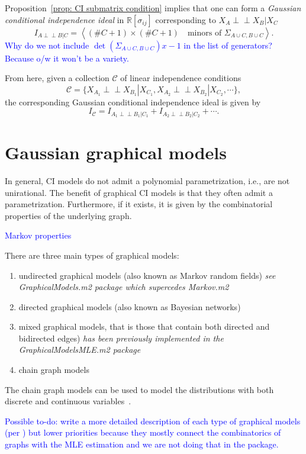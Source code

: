 \documentclass[10pt,a4paper]{article}
\newcommand{\indep}{\perp \!\!\! \perp}
\begin{document}
Proposition~\ref{prop: CI submatrix condition} implies that one can form a \emph{Gaussian conditional independence ideal} in $\mathbb{R}[\sigma_{ij}]$ corresponding to $X_A\indep X_B|X_C$
\[I_{A \indep B|C}=\left\langle (\#C+1)\times (\#C+1) \quad \text{minors of } \Sigma_{A\cup C,B \cup C} \right \rangle.\]
\textcolor{blue}{Why do we not include $\det(\Sigma_{A\cup C,B \cup C})x-1$ in the list of generators? Because o/w it won't be a variety.}

From here, given a collection $\mathcal{C}$ of linear independence conditions 
\[\mathcal{C}=\{X_{A_1}\indep X_{B_1}|X_{C_1},X_{A_2}\indep X_{B_2}|X_{C_2},\cdots\},\]
the corresponding Gaussian conditional independence ideal is given by
\[I_\mathcal{C}=I_{A_1\indep B_1|C_1}+I_{A_2\indep B_2|C_2}+\cdots.\]


\section{Gaussian graphical models}
In general, CI models do not admit a polynomial parametrization, i.e., are not unirational. The benefit of graphical CI models is that they often admit a parametrization. Furthermore, if it exists, it is given  by the combinatorial properties of the underlying graph.

\textcolor{blue}{Markov properties \cite[Section 3.2]{lauritzen1996graphical}}

There are three main types of graphical models:
\begin{enumerate}
\item undirected graphical models (also known as Markov random fields) \emph{see GraphicalModels.m2 package which supercedes Markov.m2}
\item directed graphical models (also known as Bayesian networks)
\item mixed graphical models, that is those that contain both directed and bidirected edges) \emph{has been previously implemented in the GraphicalModelsMLE.m2 package}
\item chain graph models 
\end{enumerate}
The chain graph models can be used to model the distributions with both discrete and continuous variables~\cite[Chapter 6.1.1]{lauritzen1996graphical}.

\textcolor{blue}{Possible to-do: write a more detailed description of each type of graphical models (per \cite[Chapter 3]{drton2008lectures}) but lower priorities because they mostly connect the combinatorics of graphs with the MLE estimation and we are not doing that in the package.}
\end{document}
